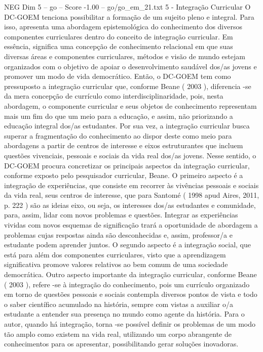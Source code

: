 \begin{textsample}{NEG Dim 5 – go – Score -1.00 – go/go\_em\_21.txt}  \label{ex:f5_neg_273}
5 - Integração Curricular O DC-GOEM tenciona possibilitar a formação de um sujeito pleno e integral.
Para isso, apresenta uma abordagem epistemológica do conhecimento dos diversos componentes curriculares dentro do conceito de integração curricular.
Em essência, significa uma concepção de conhecimento relacional em que suas diversas áreas e componentes curriculares, métodos e visão de mundo estejam organizados com o objetivo de apoiar o desenvolvimento saudável dos/as jovens e promover um modo de vida democrático.
Então, o DC-GOEM tem como pressuposto a integração curricular que, conforme Beane ( 2003 ), diferencia -se da mera concepção de currículo como interdisciplinaridade, pois, nesta abordagem, o componente curricular e seus objetos de conhecimento representam mais um fim do que um meio para a educação, e assim, não priorizando a educação integral dos/as estudantes.
Por sua vez, a integração curricular busca superar a fragmentação do conhecimento ao dispor deste como meio para abordagens a partir de centros de interesse e eixos estruturantes que incluem questões vivenciais, pessoais e sociais da vida real dos/as jovens.
Nesse sentido, o DC-GOEM procura concretizar os principais aspectos da integração curricular, conforme exposto pelo pesquisador curricular, Beane.
O primeiro aspecto é a integração de experiências, que consiste em recorrer às vivências pessoais e sociais da vida real, seus centros de interesse, que para Santomé ( 1998 apud Aires, 2011, p. 222 ) são as ideias eixo, ou seja, os interesses dos/as estudantes e comunidade, para, assim, lidar com novos problemas e questões.
Integrar as experiências vividas com novos esquemas de significação trará a oportunidade de abordagem a problemas cujas respostas ainda são desconhecidas e, assim, professor/a e estudante podem aprender juntos.
O segundo aspecto é a integração social, que está para além dos componentes curriculares, visto que a aprendizagem significativa promove valores relativos ao bem comum de uma sociedade democrática.
Outro aspecto importante da integração curricular, conforme Beane ( 2003 ), refere -se à integração do conhecimento, pois um currículo organizado em torno de questões pessoais e sociais contempla diversos pontos de vista e todo o saber científico acumulado na história, sempre com vistas a auxiliar o/a estudante a entender sua presença no mundo como agente da história.
Para o autor, quando há integração, torna -se possível definir os problemas de um modo tão amplo como existem na vida real, utilizando um corpo abrangente de conhecimentos para os apresentar, possibilitando gerar soluções inovadoras.

\end{textsample}
